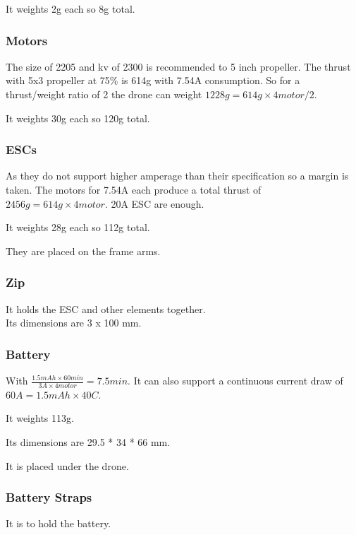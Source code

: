                 It weights 2g each so 8g total.
                
            \subsubsection{Motors}
                 The size of 2205 and kv of 2300 is recommended to 5 inch propeller. The thrust with 5x3 propeller at 75\% is 614g with 7.54A consumption. So for a thrust/weight ratio of 2 the drone can weight $1228g=614g \times 4motor / 2$.
                
                It weights 30g each so 120g total.
                
            \subsubsection{ESCs}
                As they do not support higher amperage than their specification so a margin is taken. The motors for 7.54A each produce a total thrust of $2456g=614g\times 4motor$. 20A ESC are enough.
                
                It weights 28g each so 112g total.
                
                They are placed on the frame arms.
                
            \subsubsection{Zip}
                It holds the ESC and other elements together.\\
                Its dimensions are 3 x 100 mm.
                
            \subsubsection{Battery}
                With $ \frac{1.5mAh \times 60min}{3A \times 4motor}= 7.5min$. It can also support a continuous current draw of $60A = 1.5mAh\times 40C$.
                
                It weights 113g.
                
                Its dimensions are 29.5 * 34 * 66 mm.
                
                It is placed under the drone.
                
            \subsubsection{Battery Straps}
                It is to hold the battery.
                
